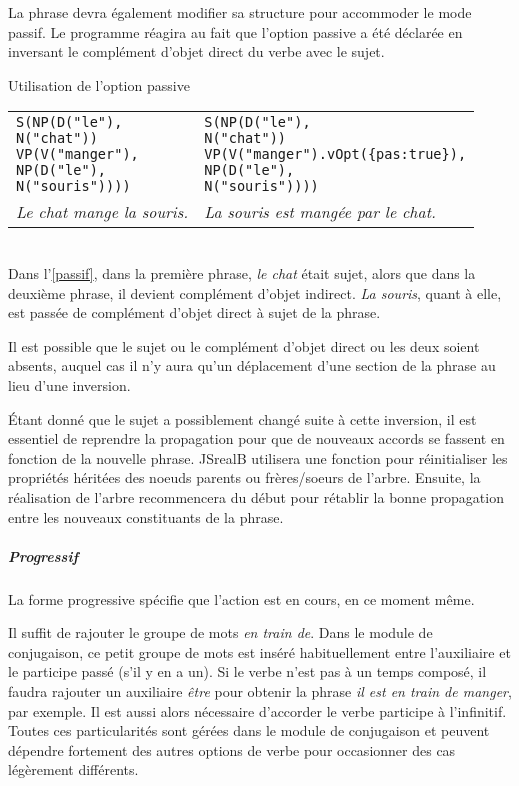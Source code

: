 \documentclass[11pt]{article} %
\newcommand{\system}[1]{\textsf{#1}}
\newcommand{\JSB}{\system{JSrealB}}
\newcommand{\real}[1]{\emph{#1}}
\begin{document}
La phrase devra également modifier sa
structure pour accommoder le mode passif. Le programme réagira au
fait que l'option passive a été déclarée en inversant le complément
d'objet direct du verbe avec le sujet. \\
\begin{example}
\caption{Utilisation de l'option passive}
\begin{tabular}{p{7cm} p{7cm}}
\begin{alltt}
S(NP(D("le"),
     N("chat"))
  VP(V("manger"),
     NP(D("le"),
        N("souris"))))
\end{alltt} &
\begin{alltt}
S(NP(D("le"),
     N("chat"))
  VP(V("manger").vOpt(\{pas:true\}),
     NP(D("le"),
        N("souris"))))
\end{alltt}
\\
\real{Le chat mange la souris.} & \real{La souris est mangée par le chat.}
\end{tabular}
\label{passif}
\end{example}
\\
Dans l'\autoref{passif}, dans la première phrase, \emph{le chat} était sujet, alors que dans la
deuxième phrase, il devient complément d'objet indirect. \emph{La souris}, quant à elle, 
est passée de complément d'objet direct à sujet de la phrase.

Il est possible que le sujet ou le complément d'objet direct ou les deux soient absents, auquel cas
il n'y aura qu'un déplacement d'une section de la phrase au lieu d'une
inversion. 

Étant donné que le sujet a possiblement changé suite à
cette inversion, il est essentiel de reprendre la propagation
pour que de nouveaux accords se fassent en fonction de la nouvelle
phrase. \JSB{} utilisera une fonction pour réinitialiser les propriétés
héritées des noeuds parents ou frères/soeurs de l'arbre. Ensuite,
la réalisation de l'arbre recommencera du début pour rétablir la bonne
propagation entre les nouveaux constituants de la phrase.

\subparagraph{Progressif}

La forme progressive spécifie que l'action est en cours, en ce moment même. 

Il suffit de rajouter le groupe de
mots \emph{en train de}. Dans le module de conjugaison, ce petit groupe de
mots est inséré habituellement entre l'auxiliaire et le participe
passé (s'il y en a un). Si le verbe n'est pas à un temps composé,
il faudra rajouter un auxiliaire \emph{être }pour obtenir la phrase
\emph{il est en train de manger}, par exemple. Il est aussi alors
nécessaire d'accorder le verbe participe à l'infinitif. Toutes ces
particularités sont gérées dans le module de conjugaison et peuvent
dépendre fortement des autres options de verbe pour occasionner des
cas légèrement différents.
\end{document}
